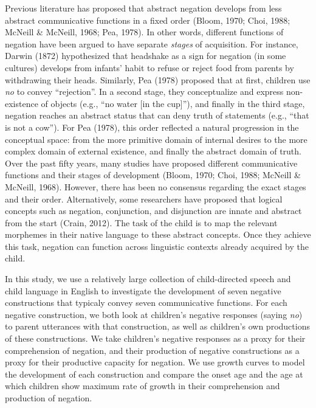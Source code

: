 \documentclass[
  man,floatsintext]{apa6}
\begin{document}
Previous literature has proposed that abstract negation develops from less abstract communicative functions in a fixed order (Bloom, 1970; Choi, 1988; McNeill \& McNeill, 1968; Pea, 1978). In other words, different functions of negation have been argued to have separate \emph{stages} of acquisition. For instance, Darwin (1872) hypothesized that headshake as a sign for negation (in some cultures) develops from infants' habit to refuse or reject food from parents by withdrawing their heads. Similarly, Pea (1978) proposed that at first, children use \emph{no} to convey ``rejection''. In a second stage, they conceptualize and express non-existence of objects (e.g., ``no water {[}in the cup{]}''), and finally in the third stage, negation reaches an abstract status that can deny truth of statements (e.g., ``that is not a cow''). For Pea (1978), this order reflected a natural progression in the conceptual space: from the more primitive domain of internal desires to the more complex domain of external existence, and finally the abstract domain of truth. Over the past fifty years, many studies have proposed different communicative functions and their stages of development (Bloom, 1970; Choi, 1988; McNeill \& McNeill, 1968). However, there has been no consensus regarding the exact stages and their order. Alternatively, some researchers have proposed that logical concepts such as negation, conjunction, and disjunction are innate and abstract from the start (Crain, 2012). The task of the child is to map the relevant morphemes in their native language to these abstract concepts. Once they achieve this task, negation can function across linguistic contexts already acquired by the child.

In this study, we use a relatively large collection of child-directed speech and child language in English to investigate the development of seven negative constructions that typicaly convey seven communicative functions. For each negative construction, we both look at children's negative responses (saying \emph{no}) to parent utterances with that construction, as well as children's own productions of these constructions. We take children's negative responses as a proxy for their comprehension of negation, and their production of negative constructions as a proxy for their productive capacity for negation. We use growth curves to model the development of each construction and compare the onset age and the age at which children show maximum rate of growth in their comprehension and production of negation.
\end{document}
